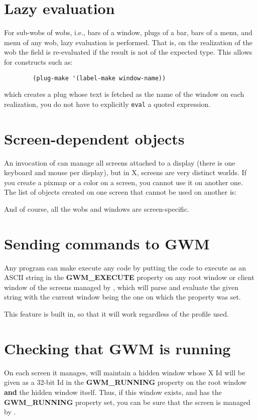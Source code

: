 \section{Lazy evaluation}

For sub-wobs of wobs, i.e., bars of a window, plugs of a bar, bars of a
menu, and menu of any wob, lazy evaluation is performed. That is, on the
realization of the wob the field is re-evaluated if the result is not
of the expected type. This allows for constructs such as:

{\exemplefont\begin{verbatim}
        (plug-make '(label-make window-name))
\end{verbatim}}

which creates a plug whose text is fetched as the name of the
window on each realization, you do not have to explicitly \verb"eval" a
quoted expression.

\section{Screen-dependent objects}

An invocation of {\GWM} can manage all screens attached to a display (there
is one keyboard and mouse per display), but in X, screens are very distinct
worlds. If you create a pixmap or a color on a screen, you cannot use it on
another one. The list of objects created on one screen that cannot be used
on another is:


And of course, all the wobs and windows are screen-specific.

\section{Sending commands to GWM}

Any program can make {\GWM} execute any {\WOOL} code by putting the {\WOOL}
code to execute as an ASCII string in the {\bf GWM\_EXECUTE}
\label{GWM_EXECUTE} property on any root window or client window
of the screens managed by {\GWM}, which will parse and evaluate the given
string with the current window being the one on which the property was set.

This feature is built in, so that it will work regardless of the
profile used.

\section{Checking that GWM is running}

On each screen it manages, {\GWM} will maintain a hidden window whose
X Id will be given as a 32-bit Id in the {\bf GWM\_RUNNING} property
on the root window {\bf and} the hidden window itself. Thus, if this
window exists, and has the {\bf GWM\_RUNNING} property set, you can be
sure that the screen is managed by {\GWM}.
